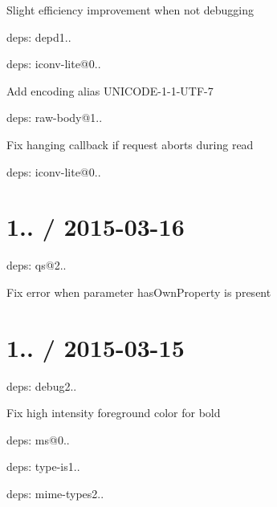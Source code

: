 \begin{DoxyItemize}
\item Slight efficiency improvement when not debugging
\item deps\+: depd1..
\item deps\+: iconv-\/lite@0..
\begin{DoxyItemize}
\item Add encoding alias U\+N\+I\+C\+O\+D\+E-\/1-\/1-\/\+U\+T\+F-\/7
\end{DoxyItemize}
\item deps\+: raw-\/body@1..
\begin{DoxyItemize}
\item Fix hanging callback if request aborts during read
\item deps\+: iconv-\/lite@0..
\end{DoxyItemize}
\end{DoxyItemize}

\section*{1.. / 2015-\/03-\/16 }


\begin{DoxyItemize}
\item deps\+: qs@2..
\begin{DoxyItemize}
\item Fix error when parameter {\ttfamily has\+Own\+Property} is present
\end{DoxyItemize}
\end{DoxyItemize}

\section*{1.. / 2015-\/03-\/15 }


\begin{DoxyItemize}
\item deps\+: debug2..
\begin{DoxyItemize}
\item Fix high intensity foreground color for bold
\item deps\+: ms@0..
\end{DoxyItemize}
\item deps\+: type-\/is1..
\begin{DoxyItemize}
\item deps\+: mime-\/types2..
\end{DoxyItemize}
\end{DoxyItemize}

